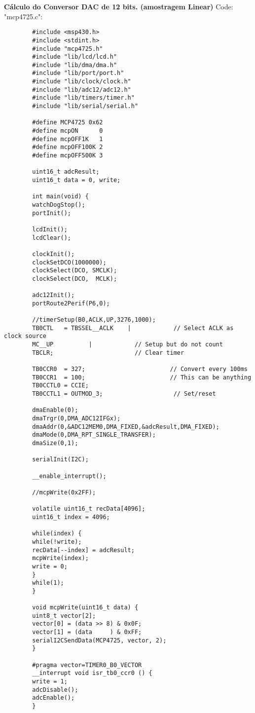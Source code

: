 	\textbf{Cálculo do Conversor DAC de 12 bits. (amostragem Linear)}
	Code: "mcp4725.c":
	\begin{lstlisting}
		#include <msp430.h> 
		#include <stdint.h>
		#include "mcp4725.h"
		#include "lib/lcd/lcd.h"
		#include "lib/dma/dma.h"
		#include "lib/port/port.h"
		#include "lib/clock/clock.h"
		#include "lib/adc12/adc12.h"
		#include "lib/timers/timer.h"
		#include "lib/serial/serial.h"
		
		#define MCP4725 0x62
		#define mcpON      0
		#define mcpOFF1K   1
		#define mcpOFF100K 2
		#define mcpOFF500K 3
		
		uint16_t adcResult;
		uint16_t data = 0, write;
		
		int main(void) {
		watchDogStop();
		portInit();
		
		lcdInit();
		lcdClear();
		
		clockInit();
		clockSetDCO(1000000);
		clockSelect(DCO, SMCLK);
		clockSelect(DCO,  MCLK);
		
		adc12Init();
		portRoute2Perif(P6,0);
		
		//timerSetup(B0,ACLK,UP,3276,1000);
		TB0CTL   = TBSSEL__ACLK    |            // Select ACLK as clock source
		MC__UP          |            // Setup but do not count
		TBCLR;                       // Clear timer
		
		TB0CCR0  = 327;                        // Convert every 100ms
		TB0CCR1  = 100;                        // This can be anything
		TB0CCTL0 = CCIE;
		TB0CCTL1 = OUTMOD_3;                    // Set/reset
		
		dmaEnable(0);
		dmaTrgr(0,DMA_ADC12IFGx);
		dmaAddr(0,&ADC12MEM0,DMA_FIXED,&adcResult,DMA_FIXED);
		dmaMode(0,DMA_RPT_SINGLE_TRANSFER);
		dmaSize(0,1);
		
		serialInit(I2C);
		
		__enable_interrupt();
		
		//mcpWrite(0x2FF);
		
		volatile uint16_t recData[4096];
		uint16_t index = 4096;
		
		while(index) {
		while(!write);
		recData[--index] = adcResult;
		mcpWrite(index);
		write = 0;
		}
		while(1);
		}
		
		void mcpWrite(uint16_t data) {
		uint8_t vector[2];
		vector[0] = (data >> 8) & 0x0F;
		vector[1] = (data     ) & 0xFF;
		serialI2CSendData(MCP4725, vector, 2);
		}
		
		#pragma vector=TIMER0_B0_VECTOR
		__interrupt void isr_tb0_ccr0 () {
		write = 1;
		adcDisable();
		adcEnable();
		}
			
	\end{lstlisting}
	
